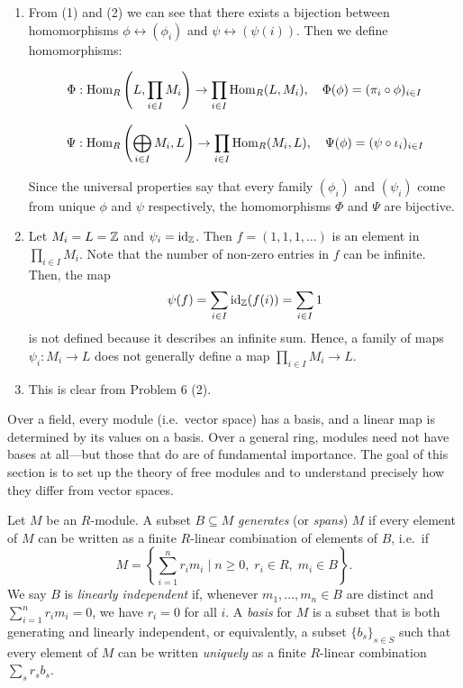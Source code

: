 \documentclass[Notebook.tex]{subfiles}
\begin{document}
\begin{solution}
\begin{enumerate}
            Since $f$ was arbitrary, $\phi = \psi$.


            \item From (1) and (2) we can see that there exists a bijection between homomorphisms $\phi \leftrightarrow (\phi_i)$ and $\psi \leftrightarrow (\psi(i))$. Then we define homomorphisms: 
            
            \[\Phi: \operatorname{Hom}_R\left(L, \prod_{i \in I} M_i\right) \to \prod_{i \in I}\operatorname{Hom}_R(L, M_i), \quad \Phi(\phi) = (\pi_i \circ \phi)_{i \in I}\]

            \[\Psi: \operatorname{Hom}_R\left(\bigoplus_{i \in I} M_i, L\right) \to \prod_{i \in I}\operatorname{Hom}_R( M_i, L), \quad \Psi(\phi) = (\psi \circ \iota_i)_{i \in I}\]

            Since the universal properties say that every family $(\phi_i)$ and $(\psi_i)$ come from unique $\phi$ and $\psi$ respectively, the homomorphisms $\Phi$ and $\Psi$ are bijective. 


            \item Let $M_i = L = \mathbb Z$ and $\psi_i = \operatorname{id}_\mathbb Z$. Then $f = (1, 1, 1, \ldots)$ is an element in $\prod_{i \in I} M_i$. Note that the number of non-zero entries in $f$ can be infinite. Then, the map \[\psi(f) = \sum_{i \in I} \operatorname{id}_\mathbb Z(f(i)) = \sum_{i \in I} 1\] is not defined because it describes an infinite sum. Hence, a family of maps $\psi_i:M_i\to L$ does not generally define a map $\prod_{i \in I} M_i\to L$. 
            
            \item This is clear from Problem 6 (2). 

        \end{enumerate}
    \end{solution}

    \newpage 

    \hrulefill

    Over a field, every module (i.e.\ vector space) has a basis, and a linear map is determined by its values on a basis. Over a general ring, modules need not have bases at all---but those that do are of fundamental importance. The goal of this section is to set up the theory of free modules and to understand precisely how they differ from vector spaces.
    
    Let $M$ be an $R$-module. A subset $B \subseteq M$ \emph{generates} (or \emph{spans}) $M$ if every element of $M$ can be written as a finite $R$-linear combination of elements of $B$, i.e.\ if
    \[
    M = \left\{\sum_{i=1}^n r_i m_i \;\bigg|\; n\geq 0,\; r_i\in R,\; m_i\in B\right\}.
    \]
    We say $B$ is \emph{linearly independent} if, whenever $m_1,\ldots,m_n\in B$ are distinct and $\sum_{i=1}^n r_i m_i = 0$, we have $r_i=0$ for all $i$. A \emph{basis} for $M$ is a subset that is both generating and linearly independent, or equivalently, a subset $\{b_s\}_{s\in S}$ such that every element of $M$ can be written \emph{uniquely} as a finite $R$-linear combination $\sum_s r_s b_s$.
    
\end{document}
